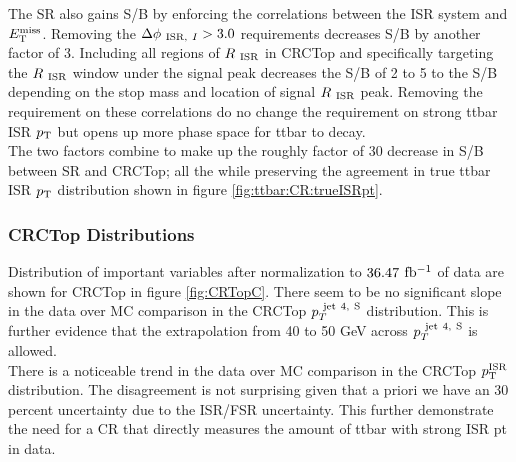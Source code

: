 \indent The SR also gains S/B by enforcing the correlations between the ISR system and $E_{\mathrm{T}}^{\mathrm{miss}}$.  Removing the $\Delta\phi_{~\mathrm{ISR},~I} > 3.0$ requirements decreases S/B by another factor of 3. Including all regions of $R_{~\mathrm{ISR}}$ in CRCTop and specifically targeting the $R_{~\mathrm{ISR}}$ window under the signal peak decreases the S/B of 2 to 5 to the S/B depending on the stop mass and location of signal $R_{~\mathrm{ISR}}$ peak.  Removing the requirement on these correlations do no change the requirement on strong ttbar ISR $p_{\mathrm{T}}$ but opens up more phase space for ttbar to decay.  \\

\indent The two factors combine to make up the roughly factor of 30 decrease in S/B between SR and CRCTop; all the while preserving the agreement in true ttbar ISR $p_{\mathrm{T}}$ distribution shown in figure \ref{fig:ttbar:CR:trueISRpt}. \\

\subsubsection*{CRCTop Distributions}

\indent Distribution of important variables after normalization to $36.47$ $\mbox{fb$^{-1}$}$ of data are shown for CRCTop in figure \ref{fig:CRTopC}.  There seem to be no significant slope in the data over MC comparison in the CRCTop $p_{T}^{~\mathrm{jet~4,~S}}$ distribution.  This is further evidence that the extrapolation from 40 to 50 GeV across $p_{T}^{~\mathrm{jet~4,~S}}$ is allowed.  \\

\indent There is a noticeable trend in the data over MC comparison in the CRCTop $p_{\mathrm{T}}^{\mathrm{ISR}}$ distribution.  The disagreement is not surprising given that a priori we have an 30 percent uncertainty due to the ISR/FSR uncertainty.  This further demonstrate the need for a CR that directly measures the amount of ttbar with strong ISR pt in data. \\

